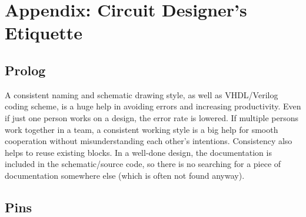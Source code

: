 \documentclass[
  a4paper,
  DIV=11,
  numbers=noendperiod]{scrartcl}
\begin{document}
\section{Appendix: Circuit Designer's
Etiquette}\label{sec-designers-etiquette}

\subsection{Prolog}\label{prolog}

A consistent naming and schematic drawing style, as well as VHDL/Verilog
coding scheme, is a huge help in avoiding errors and increasing
productivity. Even if just one person works on a design, the error rate
is lowered. If multiple persons work together in a team, a consistent
working style is a big help for smooth cooperation without
misunderstanding each other's intentions. Consistency also helps to
reuse existing blocks. In a well-done design, the documentation is
included in the schematic/source code, so there is no searching for a
piece of documentation somewhere else (which is often not found anyway).

\subsection{Pins}\label{pins}
\end{document}
